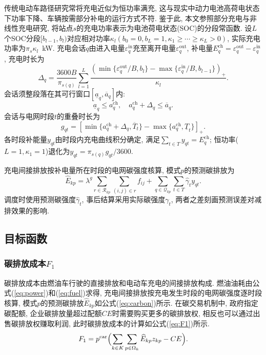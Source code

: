 \documentclass{setp-new}
\begin{document}
传统电动车路径研究常将充电近似为恒功率满充,
这与现实中动力电池高荷电状态下功率下降、车辆按需部分补电的运行方式不符.
鉴于此, 本文参照部分充电与非线性充电研究\cite{ref:45,ref:46},
将站点$s$的充电功率表示为电池荷电状态(SOC)的分段常函数.
设$L$个SOC分段$[b_{l-1},b_l)$对应相对功率$\kappa_l(b_0=0,b_L=1,\kappa_1\ge\cdots\ge\kappa_L>0)$,
实际充电功率为$\pi_s\kappa_l$~kW.
充电会话$q$由进入电量$\varepsilon_q^{\mathrm{in}}$充至离开电量$\varepsilon_q^{\mathrm{out}}$,
补电量$E_q^{\mathrm{ch}}=\varepsilon_q^{\mathrm{out}}-\varepsilon_q^{\mathrm{in}}$,
充电时长为
\begin{equation}
\Delta_q=\frac{3600 B}{\pi_{s(q)}}\sum_{l=1}^{L}
\frac{(\min\{\varepsilon_q^{\mathrm{out}}/B,b_l\}
-\max\{\varepsilon_q^{\mathrm{in}}/B,b_{l-1}\})_+}{\kappa_l}.
\label{eq:charge_duration}
\end{equation}
会话须整段落在其可行窗口$[\underline a_q,\overline a_q]$内:
\begin{equation}
\underline a_q\le a_q^{\mathrm{ch}},\quad a_q^{\mathrm{ch}}+\Delta_q\le\overline a_q.
\label{eq:charge_window}
\end{equation}
会话与电网时段$t$的重叠时长为
\begin{equation}
g_{qt}=[\min\{a_q^{\mathrm{ch}}+\Delta_q,\overline T_t\}-\max\{a_q^{\mathrm{ch}},\underline T_t\}]_+ .
\label{eq:charge_overlap}
\end{equation}
各时段补能量$y_{qt}$由时段内充电曲线积分确定, 满足$\sum_{t\in T}y_{qt}=E_q^{\mathrm{ch}}$;
恒功率($L=1,\kappa_1=1$)退化为$y_{qt}=\pi_{s(q)}g_{qt}/3600$.

充电间接排放按补电量所在时段的电网碳强度核算,
模式$p$的预测碳排放为
\begin{equation}
\widehat E_{kp}=\lambda^g\sum_{r\in\mathcal R_{kp}}\sum_{(i,j)\in r}f_{ij}
+\sum_{q\in\mathcal Q_{kp}}\sum_{t\in T}\widehat\gamma_t y_{qt}.
\label{eq:carbon}
\end{equation}
调度时使用预测碳强度$\widehat\gamma_t$, 事后结算采用实际碳强度$\gamma_t$,
两者之差刻画预测误差对减排效果的影响.

\subsection{目标函数}

\subsubsection{碳排放成本\texorpdfstring{$F_1$}{F1}}
碳排放成本由燃油车行驶的直接排放和电动车充电的间接排放构成.
燃油油耗由公式(\ref{eq:power})和(\ref{eq:fuel})求得,
充电间接排放按充电发生时段的电网碳强度逐时段核算,
模式$p$的预测碳排放$\widehat E_{kp}$如公式(\ref{eq:carbon})所示.
在碳交易机制中, 政府指定碳配额,
企业碳排放量超过配额$CE$时需要购买更多的碳排放权,
相反也可以通过出售碳排放权赚取利润, 此时碳排放成本的计算如公式(\ref{eq:F1})所示.
\begin{equation}
F_1=p^{\mathrm{car}}\Bigl(\sum_{k\in K}\sum_{p\in\Omega_k}\widehat E_{kp}z_{kp}-CE\Bigr).
\label{eq:F1}
\end{equation}
\end{document}

